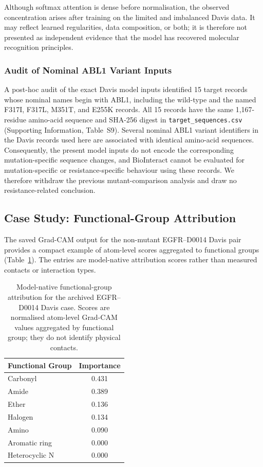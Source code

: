 \documentclass[fleqn,10pt]{wlscirep}
\begin{document}
\FloatBarrier

Although softmax attention is dense before normalisation, the observed
concentration arises after training on the limited and imbalanced Davis data.
It may reflect learned regularities, data composition, or both; it is therefore
not presented as independent evidence that the model has recovered molecular
recognition principles.

\subsubsection{Audit of Nominal ABL1 Variant Inputs}

A post-hoc audit of the exact Davis model inputs identified 15 target records
whose nominal names begin with ABL1, including the wild-type and the named
F317I, F317L, M351T, and E255K records.  All 15 records have the same
1,167-residue amino-acid sequence and SHA-256 digest in
\texttt{target\_sequences.csv} (Supporting Information, Table~S9).
Several nominal ABL1 variant identifiers in the Davis records used here are
associated with identical amino-acid sequences. Consequently, the present model
inputs do not encode the corresponding mutation-specific sequence changes, and
BioInteract cannot be evaluated for mutation-specific or resistance-specific
behaviour using these records. We therefore withdraw the previous
mutant-comparison analysis and draw no resistance-related conclusion.

\subsection{Case Study: Functional-Group Attribution}

The saved Grad-CAM output for the non-mutant EGFR--D0014 Davis pair provides a
compact example of atom-level scores aggregated to functional groups
(Table~\ref{tab:functional_group}).  The entries are model-native attribution
scores rather than measured contacts or interaction types.

\begin{table}[htbp]
\centering
\caption{Model-native functional-group attribution for the archived EGFR--D0014
  Davis case. Scores are normalised atom-level Grad-CAM values aggregated by
  functional group; they do not identify physical contacts.}
\label{tab:functional_group}
\begin{tabular}{lc}
\toprule
\textbf{Functional Group} & \textbf{Importance} \\
\midrule
Carbonyl       & 0.431 \\
Amide          & 0.389 \\
Ether          & 0.136 \\
Halogen        & 0.134 \\
Amino          & 0.090 \\
Aromatic ring  & 0.000 \\
Heterocyclic N & 0.000 \\
\bottomrule
\end{tabular}
\end{table}
\end{document}

